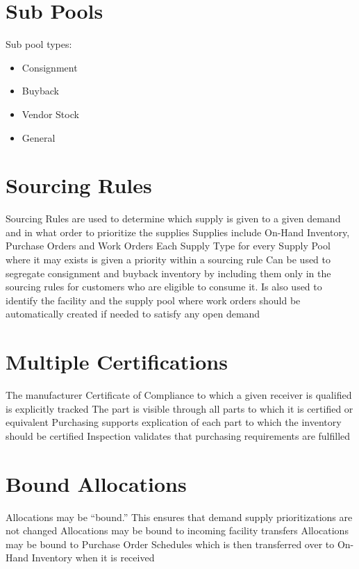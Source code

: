 \documentclass[letterpaper,10pt,english]{sphinxmanual}
\begin{document}
\section{Sub Pools}
\label{APS/ApsFeatures:sub-pools}
Sub pool types:
\begin{itemize}
\item {} 
Consignment

\item {} 
Buyback

\item {} 
Vendor Stock

\item {} 
General

\end{itemize}


\section{Sourcing Rules}
\label{APS/ApsFeatures:sourcing-rules}
Sourcing Rules are used to determine which supply is given to a given
demand and in what order to prioritize the supplies Supplies include
On-Hand Inventory, Purchase Orders and Work Orders Each Supply Type for
every Supply Pool where it may exists is given a priority within a
sourcing rule Can be used to segregate consignment and buyback inventory
by including them only in the sourcing rules for customers who are
eligible to consume it. Is also used to identify the facility and the
supply pool where work orders should be automatically created if needed
to satisfy any open demand


\section{Multiple Certifications}
\label{APS/ApsFeatures:multiple-certifications}
The manufacturer Certificate of Compliance to which a given receiver is
qualified is explicitly tracked The part is visible through all parts to
which it is certified or equivalent Purchasing supports explication of
each part to which the inventory should be certified Inspection
validates that purchasing requirements are fulfilled


\section{Bound Allocations}
\label{APS/ApsFeatures:bound-allocations}
Allocations may be “bound.” This ensures that demand supply
prioritizations are not changed Allocations may be bound to incoming
facility transfers Allocations may be bound to Purchase Order Schedules
which is then transferred over to On-Hand Inventory when it is received
\end{document}
